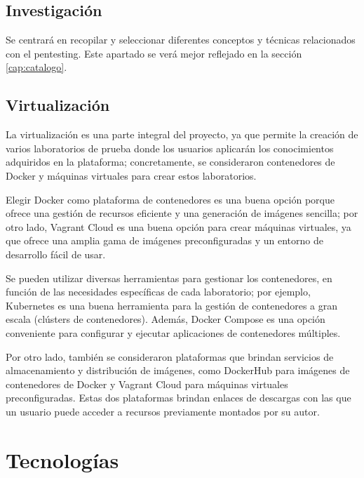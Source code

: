         \subsection{Investigación}
        
            Se centrará en recopilar y seleccionar diferentes conceptos y técnicas relacionados con el pentesting. Este apartado se verá mejor reflejado en la sección \ref{cap:catalogo}.
        
        \subsection{Virtualización}

            La virtualización es una parte integral del proyecto, ya que permite la creación de varios laboratorios de prueba donde los usuarios aplicarán los conocimientos adquiridos en la plataforma; concretamente, se consideraron contenedores de Docker y máquinas virtuales para crear estos laboratorios.
            
            Elegir Docker como plataforma de contenedores es una buena opción porque ofrece una gestión de recursos eficiente y una generación de imágenes sencilla; por otro lado, Vagrant Cloud es una buena opción para crear máquinas virtuales, ya que ofrece una amplia gama de imágenes preconfiguradas y un entorno de desarrollo fácil de usar.
            
            Se pueden utilizar diversas herramientas para gestionar los contenedores, en función de las necesidades específicas de cada laboratorio; por ejemplo, Kubernetes es una buena herramienta para la gestión de contenedores a gran escala (clústers de contenedores). Además, Docker Compose es una opción conveniente para configurar y ejecutar aplicaciones de contenedores múltiples.
            
            Por otro lado, también se consideraron plataformas que brindan servicios de almacenamiento y distribución de imágenes, como DockerHub para imágenes de contenedores de Docker y Vagrant Cloud para máquinas virtuales preconfiguradas. Estas dos plataformas brindan enlaces de descargas con las que un usuario puede acceder a recursos previamente montados por su autor.

            \newpage

            
    \section{Tecnologías}
    
